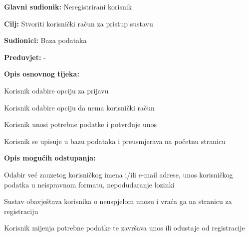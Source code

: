 \noindent {}
\begin{packed_item}

	\item \textbf{Glavni sudionik: }Neregistrirani korisnik
	\item  \textbf{Cilj:} Stvoriti korisnički račun za pristup sustavu
	\item  \textbf{Sudionici:} Baza podataka
	\item  \textbf{Preduvjet:} -
	\item  \textbf{Opis osnovnog tijeka:}

	\item[] \begin{packed_enum}

		\item Korisnik odabire opciju za prijavu
		\item Korisnik odabire opciju da nema korisnički račun
		\item Korisnik unosi potrebne podatke i potvrđuje unos
		\item Korisnik se upisuje u bazu podataka i preusmjerava na početnu stranicu
	\end{packed_enum}

	\item  \textbf{Opis mogućih odstupanja:}

	\item[] \begin{packed_item}

		\item[3.a] Odabir već zauzetog korisničkog imena i/ili e-mail adrese, unos korisničkog podatka u neispravnom formatu, nepodudaranje lozinki
		\item[] \begin{packed_enum}

			\item Sustav obavještava korisnika o neuspjelom unosu i vraća ga na stranicu za registraciju
			\item Korisnik mijenja potrebne podatke te završava unos ili odustaje od registracije

		\end{packed_enum}
	\end{packed_item}
\end{packed_item}

